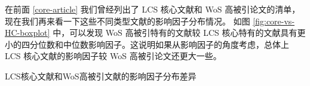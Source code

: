 \documentclass[]{ctexbook}
\begin{document}
在前面 \ref{core-article} 我们曾经列出了 LCS 核心文献和 WoS 高被引论文的清单，现在我们再来看一下这些不同类型文献的影响因子分布情况。
如图 \ref{fig:core-vs-HC-boxplot} 中，可以发现 WoS 高被引特有的文献较 LCS 核心特有的文献具有更小的四分位数和中位数影响因子。这说明如果从影响因子的角度考虑，总体上 LCS 核心文献的影响因子较 WoS 高被引论文还更大一些。

\hypertarget{htmlwidget-abf2cf8af4501a552328}{}

\label{fig:core-vs-HC-boxplot}LCS核心文献和WoS高被引文献的影响因子分布差异



\backmatter
\printindex

\listoffigures

\listoftables
\end{document}
